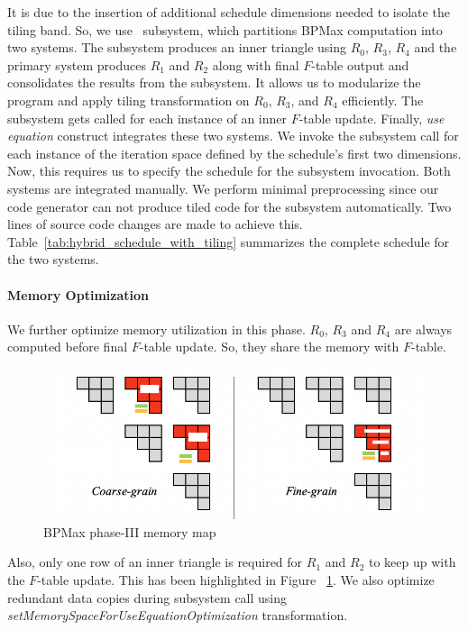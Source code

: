 It is due to the insertion of additional schedule dimensions needed to isolate the tiling band. So, we use \alfa\ subsystem, which partitions BPMax computation into two systems. The subsystem produces an inner triangle using $R_{0}$, $R_{3}$, $R_{4}$ and the primary system produces $R_{1}$ and $R_{2}$ along with final $F$-table output and consolidates the results from the subsystem. It allows us to modularize the program and apply tiling transformation on $R_{0}$, $R_{3}$, and $R_{4}$ efficiently. The subsystem gets called for each instance of an inner $F$-table update.  Finally, \textit{use equation} construct integrates these two systems. We invoke the subsystem call for each instance of the iteration space defined by the schedule's first two dimensions. Now, this requires us to specify the schedule for the subsystem invocation. Both systems are integrated manually. We perform minimal preprocessing since our code generator can not produce tiled code for the subsystem automatically. Two lines of source code changes are made to achieve this. Table~\ref{tab:hybrid_schedule_with_tiling} summarizes the complete schedule for the two systems.

 
\paragraph{Memory Optimization}
We further optimize memory utilization in this phase. $R_{0}$, $R_{3}$ and $R_{4}$ are always computed before final $F$-table update. So, they share the memory with $F$-table. 
\begin{figure}[htbp]
\begin{adjustbox}{varwidth=\textwidth,margin=0 {\abovecaptionskip} 0 0, frame=0.00pt}
\centerline{\includegraphics[scale=.63]{bpm_phase_3_memory_map.png}}
\end{adjustbox}
\caption{BPMax phase-III memory map}
\label{fig:bpm_phase_3_memory_map}
\end{figure}
Also, only one row of an inner triangle is required for $R_{1}$ and $R_{2}$ to keep up with the $F$-table update. This has been highlighted in Figure ~\ref{fig:bpm_phase_3_memory_map}. We also optimize redundant data copies during subsystem call using \textit{setMemorySpaceForUseEquationOptimization} transformation. 

